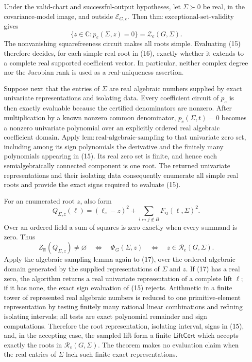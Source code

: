Under the valid-chart and successful-output hypotheses, let \(\Sigma\succ0\) be real, in the covariance-model image, and outside \(\mathcal E_{G,e}\).  Then \(\mathrm{thm:exceptional\mbox{-}set\mbox{-}validity}\) gives
\[
 \{z\in\mathbb C:p_e(\Sigma,z)=0\}=\mathcal Z_e(G,\Sigma).
\tag{16}
\]
The nonvanishing squarefreeness circuit makes all roots simple.  Evaluating (15) therefore decides, for each simple real root in (16), exactly whether it extends to a complete real supported coefficient vector.  In particular, neither complex degree nor the Jacobian rank is used as a real-uniqueness assertion.

Suppose next that the entries of \(\Sigma\) are real algebraic numbers supplied by exact univariate representations and isolating data.  Every coefficient circuit of \(p_e\) is then exactly evaluable because the certified denominators are nonzero.  After multiplication by a known nonzero common denominator, \(p_e(\Sigma,t)=0\) becomes a nonzero univariate polynomial over an explicitly ordered real algebraic coefficient domain.  Apply \(\mathrm{lem:real\mbox{-}algebraic\mbox{-}sampling}\) to that univariate zero set, including among its sign polynomials the derivative and the finitely many polynomials appearing in (15).  Its real zero set is finite, and hence each semialgebraically connected component is one root.  The returned univariate representations and their isolating data consequently enumerate all simple real roots and provide the exact signs required to evaluate (15).

For an enumerated root \(z\), also form
\[
 Q_{\Sigma,z}(\ell)
 =(\ell_e-z)^2+
 \sum_{i\leftrightarrow j\notin B}F_{ij}(\ell,\Sigma)^2.
\tag{17}
\]
Over an ordered field a sum of squares is zero exactly when every summand is zero.  Thus
\[
 Z_{\mathbb R}(Q_{\Sigma,z})\ne\varnothing
 \quad\Longleftrightarrow\quad
 \Phi_G(\Sigma,z)
 \quad\Longleftrightarrow\quad
 z\in\mathcal R_e(G,\Sigma).
\tag{18}
\]
Apply the algebraic-sampling lemma again to (17), over the ordered algebraic domain generated by the supplied representations of \(\Sigma\) and \(z\).  If (17) has a real zero, the algorithm returns a real univariate representation of a complete lift \(\ell\); if it has none, the exact sign evaluation of (15) rejects.  Arithmetic in a finite tower of represented real algebraic numbers is reduced to one primitive-element representation by testing finitely many rational linear combinations and refining isolating intervals; all tests are exact polynomial remainder and sign computations.  Therefore the root representation, isolating interval, signs in (15), and, in the accepting case, the sampled lift form a finite \(\mathsf{LiftCert}\) which accepts exactly the roots in \(\mathcal R_e(G,\Sigma)\).  The theorem makes no evaluation claim when the real entries of \(\Sigma\) lack such finite exact representations.

